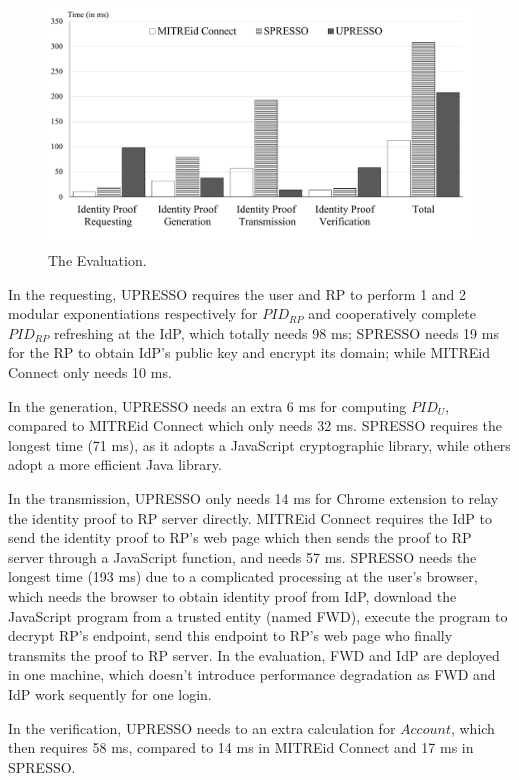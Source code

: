 \begin{figure}
  \centering
  \includegraphics[width=\linewidth]{fig/evaluation2.pdf}
  \caption{The Evaluation.}
  \label{fig:evaluation}
\end{figure}

In the requesting, UPRESSO requires the user and RP to perform 1 and 2  modular exponentiations respectively for $PID_{RP}$ and cooperatively complete $PID_{RP}$ refreshing at the IdP, which totally needs 98 ms;  SPRESSO needs 19 ms for the RP to obtain IdP's public key and encrypt its domain; while MITREid Connect only needs 10 ms.

In the generation, UPRESSO needs  an extra 6 ms for computing $PID_U$, compared to MITREid Connect which only needs 32 ms.
SPRESSO requires the longest time (71 ms), as it adopts a JavaScript cryptographic library, while others adopt a more efficient Java library.

In the transmission, UPRESSO only needs 14 ms for Chrome extension to relay the identity proof to RP server directly. 
MITREid Connect requires the IdP to send the identity proof to  RP's web page which then sends the proof to RP server through a JavaScript function, and needs 57 ms.
SPRESSO needs the longest time (193 ms) due to a complicated processing at the user's browser,
  which needs the browser to obtain identity proof from IdP, download the JavaScript program from a trusted entity (named FWD), execute the program to decrypt RP's endpoint, send this endpoint to RP's web page who finally transmits the proof to RP server.
In the evaluation,  FWD and IdP are deployed in one machine, which doesn't introduce performance degradation as  FWD and IdP work sequently for one login.


In the verification, UPRESSO needs to an extra calculation for $Account$, which then requires  58 ms, compared to 14 ms in MITREid Connect and 17 ms in SPRESSO.



